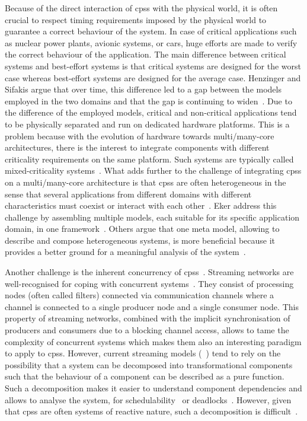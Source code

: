 Because of the direct interaction of \glspl{cps} with the physical world, it is often crucial to respect timing requirements imposed by the physical world to guarantee a correct behaviour of the system.
In case of critical applications such as nuclear power plants, avionic systems, or cars, huge efforts are made to verify the correct behaviour of the application.
The main difference between critical systems and best-effort systems is that critical systems are designed for the worst case whereas best-effort systems are designed for the average case.
Henzinger and Sifakis argue that over time, this difference led to a gap between the models employed in the two domains and that the gap is continuing to widen~\cite{henzinger2006}.
Due to the difference of the employed models, critical and non-critical applications tend to be physically separated and run on dedicated hardware platforms.
This is a problem because with the evolution of hardware towards multi/many-core architectures, there is the interest to integrate components with different criticality requirements on the same platform.
Such systems are typically called mixed-criticality systems~\cite{burns2016}.
What adds further to the challenge of integrating \glspl{cps} on a multi/many-core architecture is that \glspl{cps} are often heterogeneous in the sense that several applications from different domains with different characteristics must coexist or interact with each other~\cite{eker2003}.
Eker \etal address this challenge by assembling multiple models, each suitable for its specific application domain, in one framework~\cite{eker2003}.
Others argue that one meta model, allowing to describe and compose heterogeneous systems, is more beneficial because it provides a better ground for a meaningful analysis of the system~\cite{henzinger2006, rajkumar2010, castrillon2015}.

Another challenge is the inherent concurrency of \glspl{cps}~\cite{lee2008}.
Streaming networks are well-recognised for coping with concurrent systems~\cite{stephens1997}.
They consist of processing nodes (often called filters) connected via communication channels where a channel is connected to a single producer node and a single consumer node.
This property of streaming networks, combined with the implicit synchronisation of producers and consumers due to a blocking channel access, allows to tame the complexity of concurrent systems which makes them also an interesting paradigm to apply to \glspl{cps}.
However, current streaming models (\eg~\cite{thies2002, lee2003, grelck2010}) tend to rely on the possibility that a system can be decomposed into transformational components such that the behaviour of a component can be described as a pure function.
Such a decomposition makes it easier to understand component dependencies and allows to analyse the system, \eg for schedulability~\cite{lee1987} or deadlocks~\cite{zhou2006}.
However, given that \glspl{cps} are often systems of reactive nature, such a decomposition is difficult~\cite{harel1985}.

